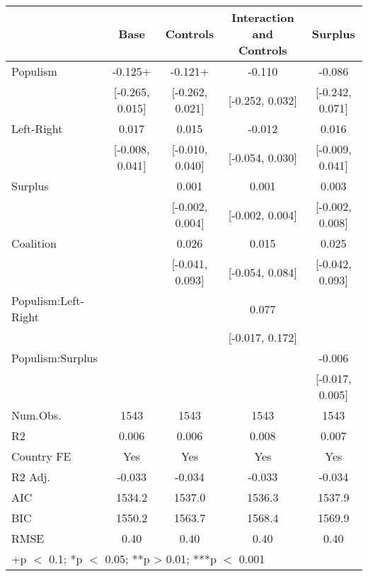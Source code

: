 \begin{table}
\centering\centering\centering
\begin{tabular}[t]{lcccc}
\toprule
  & Base & Controls & Interaction and Controls & Surplus\\
\midrule
Populism & -0.125+ & -0.121+ & -0.110 & -0.086\\
 & {}[-0.265, 0.015] & {}[-0.262, 0.021] & {}[-0.252, 0.032] & {}[-0.242, 0.071]\\
Left-Right & 0.017 & 0.015 & -0.012 & 0.016\\
 & {}[-0.008, 0.041] & {}[-0.010, 0.040] & {}[-0.054, 0.030] & {}[-0.009, 0.041]\\
Surplus &  & 0.001 & 0.001 & 0.003\\
 &  & {}[-0.002, 0.004] & {}[-0.002, 0.004] & {}[-0.002, 0.008]\\
Coalition &  & 0.026 & 0.015 & 0.025\\
 &  & {}[-0.041, 0.093] & {}[-0.054, 0.084] & {}[-0.042, 0.093]\\
Populism:Left-Right &  &  & 0.077 & \\
 &  &  & {}[-0.017, 0.172] & \\
Populism:Surplus &  &  &  & -0.006\\
 &  &  &  & {}[-0.017, 0.005]\\
\midrule
Num.Obs. & 1543 & 1543 & 1543 & 1543\\
R2 & 0.006 & 0.006 & 0.008 & 0.007\\
Country FE & Yes & Yes & Yes & Yes\\
R2 Adj. & -0.033 & -0.034 & -0.033 & -0.034\\
AIC & 1534.2 & 1537.0 & 1536.3 & 1537.9\\
BIC & 1550.2 & 1563.7 & 1568.4 & 1569.9\\
RMSE & 0.40 & 0.40 & 0.40 & 0.40\\
\bottomrule
\multicolumn{5}{l}{\rule{0pt}{1em}+p $<$ 0.1; *p $<$ 0.05; **p > 0.01; ***p $<$ 0.001}\\
\end{tabular}
\end{table}
